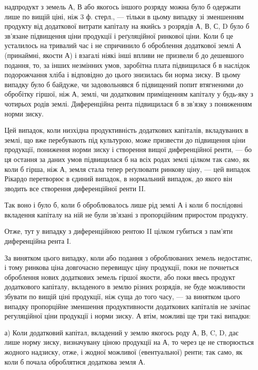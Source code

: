 \parcont{}  %
надпродукт з земель А, В або якогось іншого розряду можна було б одержати
лише по вищій ціні, ніж 3 ф. стерл., — тільки в цьому випадку зі зменшенням
продукту від додаткової витрати капіталу на якийсь з розрядів А, В, С, D
було б зв’язане підвищення ціни продукції і реґуляційної ринкової ціни.
Коли б це усталилось на тривалий час і не спричинило б оброблення додаткової
землі А (принаймні, якости А) і взагалі ніякі інші впливи не призвели б
до дешевшого подання, то, за інших незмінних умов, заробітна плата підвищилася б
в наслідок подорожчання хліба і відповідно до цього знизилась би норма зиску.
В цьому випадку було б байдуже, чи задовольнявся б підвищений попит втягненими
до обробітку гіршої, ніж А, землі, чи додатковим приміщенням капіталу
у будь-яку з чотирьох родів землі. Диференційна рента підвищилася б в зв’язку
з пониженням норми зиску.

Цей випадок, коли низхідна продуктивність додаткових капіталів, вкладуваних
в землі, що вже перебувають під культурою, може призвести до підвищення
ціни продукції, пониження норми зиску і створення вищої диференційної
ренти, — бо ця остання за даних умов підвищилася б на всіх родах землі
цілком так само, як коли б гірша, ніж А, земля стала тепер реґулювати ринкову
ціну, — цей випадок Рікардо перетворює в єдиний випадок, в нормальний
випадок, до якого він зводить все створення диференційної ренти II.

Так воно і було б, коли б оброблювалось лише рід землі А і коли б послідовні
вкладення капіталу на ній не були зв’язані з пропорційним приростом
продукту.

Отже, тут у випадку з диференційною рентою II цілком губиться з пам’яти
диференційна рента І.

За винятком цього випадку, коли або подання з оброблюваних земель
недостатнє, і тому ринкова ціна довгочасно перевищує ціну продукції, поки не
почнеться оброблення нових додаткових земель гіршої якости, або поки ввесь продукт
додаткового капіталу, вкладеного в землю різних розрядів, не буде можливости
збувати по вищій ціні продукції, ніж суща до того часу, — за винятком
цього випадку пропорційне зменшення продуктивности додаткових капіталів не
зачіпає регуляційної ціни продукції і норми зиску. А втім, можливі ще три
такі випадки:

а) Коли додатковий капітал, вкладений у землю якогось роду А, В, C, D,
дає лише норму зиску, визначувану ціною продукції на А, то через це не
створюється жодного надзиску, отже, і жодної можливої (евентуальної) ренти;
так само, як коли б почала оброблятися додаткова земля А.

